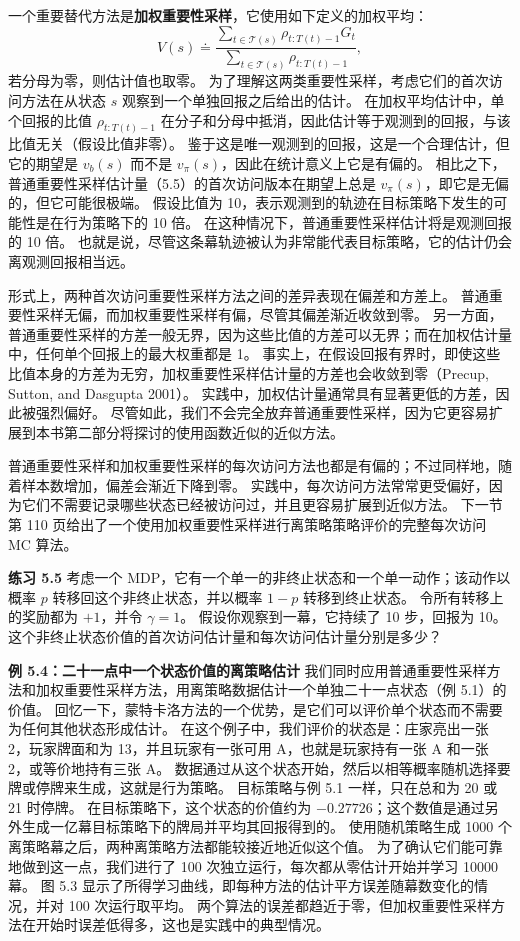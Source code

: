 \documentclass[UTF8, 12pt, fontset=fandol, oneside]{ctexart}
\begin{document}
一个重要替代方法是\textbf{加权重要性采样}，它使用如下定义的加权平均：
\begin{equation}
V(s)\doteq
\frac{\sum_{t\in\mathcal{T}(s)}\rho_{t:T(t)-1}G_t}
{\sum_{t\in\mathcal{T}(s)}\rho_{t:T(t)-1}},
\end{equation}
若分母为零，则估计值也取零。
为了理解这两类重要性采样，考虑它们的首次访问方法在从状态 $s$ 观察到一个单独回报之后给出的估计。
在加权平均估计中，单个回报的比值 $\rho_{t:T(t)-1}$ 在分子和分母中抵消，因此估计等于观测到的回报，与该比值无关（假设比值非零）。
鉴于这是唯一观测到的回报，这是一个合理估计，但它的期望是 $v_b(s)$ 而不是 $v_\pi(s)$，因此在统计意义上它是有偏的。
相比之下，普通重要性采样估计量（5.5）的首次访问版本在期望上总是 $v_\pi(s)$，即它是无偏的，但它可能很极端。
假设比值为 10，表示观测到的轨迹在目标策略下发生的可能性是在行为策略下的 10 倍。
在这种情况下，普通重要性采样估计将是观测回报的 10 倍。
也就是说，尽管这条幕轨迹被认为非常能代表目标策略，它的估计仍会离观测回报相当远。

形式上，两种首次访问重要性采样方法之间的差异表现在偏差和方差上。
普通重要性采样无偏，而加权重要性采样有偏，尽管其偏差渐近收敛到零。
另一方面，普通重要性采样的方差一般无界，因为这些比值的方差可以无界；而在加权估计量中，任何单个回报上的最大权重都是 1。
事实上，在假设回报有界时，即使这些比值本身的方差为无穷，加权重要性采样估计量的方差也会收敛到零（Precup, Sutton, and Dasgupta 2001）。
实践中，加权估计量通常具有显著更低的方差，因此被强烈偏好。
尽管如此，我们不会完全放弃普通重要性采样，因为它更容易扩展到本书第二部分将探讨的使用函数近似的近似方法。

普通重要性采样和加权重要性采样的每次访问方法也都是有偏的；不过同样地，随着样本数增加，偏差会渐近下降到零。
实践中，每次访问方法常常更受偏好，因为它们不需要记录哪些状态已经被访问过，并且更容易扩展到近似方法。
下一节第 110 页给出了一个使用加权重要性采样进行离策略策略评价的完整每次访问 MC 算法。

\noindent\textbf{练习 5.5}
考虑一个 MDP，它有一个单一的非终止状态和一个单一动作；该动作以概率 $p$ 转移回这个非终止状态，并以概率 $1-p$ 转移到终止状态。
令所有转移上的奖励都为 $+1$，并令 $\gamma=1$。
假设你观察到一幕，它持续了 10 步，回报为 10。
这个非终止状态价值的首次访问估计量和每次访问估计量分别是多少？

\noindent\textbf{例 5.4：二十一点中一个状态价值的离策略估计}
我们同时应用普通重要性采样方法和加权重要性采样方法，用离策略数据估计一个单独二十一点状态（例 5.1）的价值。
回忆一下，蒙特卡洛方法的一个优势，是它们可以评价单个状态而不需要为任何其他状态形成估计。
在这个例子中，我们评价的状态是：庄家亮出一张 2，玩家牌面和为 13，并且玩家有一张可用 A，也就是玩家持有一张 A 和一张 2，或等价地持有三张 A。
数据通过从这个状态开始，然后以相等概率随机选择要牌或停牌来生成，这就是行为策略。
目标策略与例 5.1 一样，只在总和为 20 或 21 时停牌。
在目标策略下，这个状态的价值约为 $-0.27726$；这个数值是通过另外生成一亿幕目标策略下的牌局并平均其回报得到的。
使用随机策略生成 1000 个离策略幕之后，两种离策略方法都能较接近地近似这个值。
为了确认它们能可靠地做到这一点，我们进行了 100 次独立运行，每次都从零估计开始并学习 10000 幕。
图 5.3 显示了所得学习曲线，即每种方法的估计平方误差随幕数变化的情况，并对 100 次运行取平均。
两个算法的误差都趋近于零，但加权重要性采样方法在开始时误差低得多，这也是实践中的典型情况。
\end{document}
